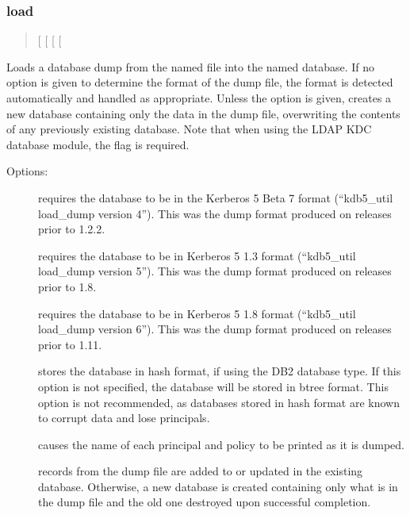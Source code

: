 \documentclass[letterpaper,10pt,english]{sphinxmanual}
\begin{document}
\subsubsection{load}
\label{\detokenize{admin/admin_commands/kdb5_util:kdb5-util-dump-end}}\label{\detokenize{admin/admin_commands/kdb5_util:load}}\label{\detokenize{admin/admin_commands/kdb5_util:kdb5-util-load}}\begin{quote}

 {[}\textbar{}\textbar{}\sphinxstylestrong{-r18}{]} {[}\sphinxstylestrong{-hash}{]}
{[}\sphinxstylestrong{-verbose}{]} {[}\sphinxstylestrong{-update}{]} 
\end{quote}

Loads a database dump from the named file into the named database.  If
no option is given to determine the format of the dump file, the
format is detected automatically and handled as appropriate.  Unless
the  option is given,  creates a new database
containing only the data in the dump file, overwriting the contents of
any previously existing database.  Note that when using the LDAP KDC
database module, the  flag is required.

Options:
\begin{description}
\item[{}] \leavevmode
requires the database to be in the Kerberos 5 Beta 7 format
(“kdb5\_util load\_dump version 4”).  This was the dump format
produced on releases prior to 1.2.2.

\item[{}] \leavevmode
requires the database to be in Kerberos 5 1.3 format (“kdb5\_util
load\_dump version 5”).  This was the dump format produced on
releases prior to 1.8.

\item[{}] \leavevmode
requires the database to be in Kerberos 5 1.8 format (“kdb5\_util
load\_dump version 6”).  This was the dump format produced on
releases prior to 1.11.

\item[{}] \leavevmode
stores the database in hash format, if using the DB2 database
type.  If this option is not specified, the database will be
stored in btree format.  This option is not recommended, as
databases stored in hash format are known to corrupt data and lose
principals.

\item[{}] \leavevmode
causes the name of each principal and policy to be printed as it
is dumped.

\item[{}] \leavevmode
records from the dump file are added to or updated in the existing
database.  Otherwise, a new database is created containing only
what is in the dump file and the old one destroyed upon successful
completion.

\end{description}
\end{document}
